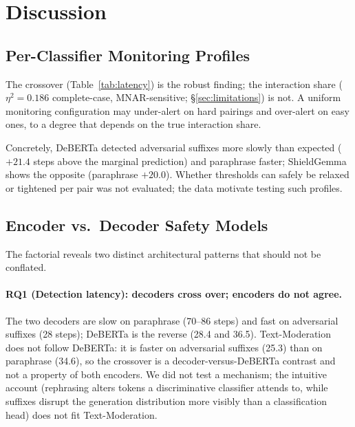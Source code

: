 \documentclass{article}
\begin{document}
\section{Discussion}
\label{sec:discussion}

\subsection{Per-Classifier Monitoring Profiles}
\label{sec:profiles}

The crossover (Table~\ref{tab:latency}) is the robust finding; the interaction share ($\eta^2 = 0.186$ complete-case, MNAR-sensitive; \S\ref{sec:limitations}) is not. A uniform monitoring configuration may under-alert on hard pairings and over-alert on easy ones, to a degree that depends on the true interaction share.

Concretely, DeBERTa detected adversarial suffixes more slowly than expected ($+21.4$ steps above the marginal prediction) and paraphrase faster; ShieldGemma shows the opposite (paraphrase $+20.0$). Whether thresholds can safely be relaxed or tightened per pair was not evaluated; the data motivate testing such profiles.

\subsection{Encoder vs.\ Decoder Safety Models}
\label{sec:encoder-decoder}

The factorial reveals two distinct architectural patterns that should not be conflated.

\paragraph{RQ1 (Detection latency): decoders cross over; encoders do not agree.} The two decoders are slow on paraphrase (70--86 steps) and fast on adversarial suffixes (28 steps); DeBERTa is the reverse (28.4 and 36.5). Text-Moderation does not follow DeBERTa: it is faster on adversarial suffixes (25.3) than on paraphrase (34.6), so the crossover is a decoder-versus-DeBERTa contrast and not a property of both encoders. We did not test a mechanism; the intuitive account (rephrasing alters tokens a discriminative classifier attends to, while suffixes disrupt the generation distribution more visibly than a classification head) does not fit Text-Moderation.
\end{document}
